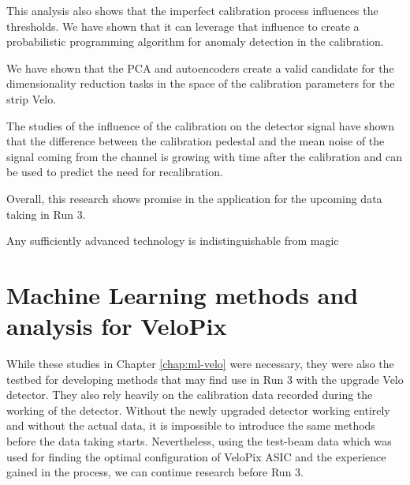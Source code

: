 This analysis also shows that the imperfect calibration process influences the thresholds. We have shown that it can leverage that influence to create a probabilistic programming algorithm for anomaly detection in the calibration.

We have shown that the PCA and autoencoders create a valid candidate for the dimensionality reduction tasks in the space of the calibration parameters for the strip Velo.

The studies of the influence of the calibration on the detector signal have shown that the difference between the calibration pedestal and the mean noise of the signal coming from the channel is growing with time after the calibration and can be used to predict the need for recalibration.

Overall, this research shows promise in the application for the upcoming data taking in Run 3.


\begin{savequote}[75mm]
Any sufficiently advanced technology is indistinguishable from magic
\end{savequote}
\chapter{Machine Learning methods and analysis for VeloPix}
\label{chap:ml-velo-pix}

While these studies in Chapter \ref{chap:ml-velo} were necessary, they were also the testbed for developing methods that may find use in Run 3 with the upgrade Velo detector.
They also rely heavily on the calibration data recorded during the working of the detector. 
Without the newly upgraded detector working entirely and without the actual data, it is impossible to introduce the same methods before the data taking starts.
Nevertheless, using the test-beam data which was used for finding the optimal configuration of VeloPix ASIC and the experience gained in the process, we can continue research before Run 3.

